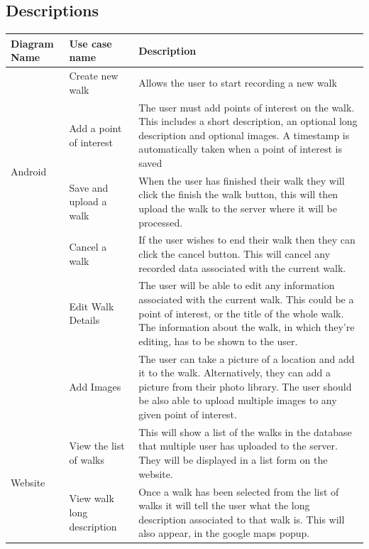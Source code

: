 \documentclass[12pt]{article}
\begin{document}
\subsection{Descriptions}
\setlength\LTleft{-1cm}
\begin{longtable}{|p{2cm}|p{3cm}|p{10cm}|}
\hline
	Diagram Name & Use case name  & Description \\
\hline

 \multirow{4}{*}{Android} & \multicolumn{1}{|p{3cm}|}{Create new walk} & \multicolumn{1}{|p{10cm}|}{Allows the user to start recording a new walk} \\\cline{2-3} & \multicolumn{1}{|p{3cm}|}{Add a point of interest
} & \multicolumn{1}{|p{10cm}|}{The user must add points of interest on the walk. This includes a short description, an optional long description and optional images. A timestamp is automatically taken when a point of interest is saved}
\\\cline{2-3} & \multicolumn{1}{|p{3cm}|}{Save and upload a walk} & \multicolumn{1}{|p{10cm}|}{When the user has finished their walk they will click the finish the walk button, this will then upload the walk to the server where it will be processed.}
\\\cline{2-3} & \multicolumn{1}{|p{3cm}|}{Cancel a walk} & \multicolumn{1}{|p{10cm}|}{If the user wishes to end their walk then they can click the cancel button. This will cancel any recorded data associated with the current walk.}
\\\cline{2-3} & \multicolumn{1}{|p{3cm}|}{Edit Walk Details} & \multicolumn{1}{|p{10cm}|}{The user will be able to edit any information associated with the current walk. This could be a point of interest, or the title of the whole walk. The information about the walk, in which they're editing, has to be shown to the user.}
\\\cline{2-3} & \multicolumn{1}{|p{3cm}|}{Add Images} & \multicolumn{1}{|p{10cm}|}{The user can take a picture of a location and add it to the walk. Alternatively, they can add a picture from their photo library. The user should be also able to upload multiple images to any given point of interest.}
\\\hline
 \multirow{4}{*}{Website} & \multicolumn{1}{|p{3cm}|}{View the list of walks} & \multicolumn{1}{|p{10cm}|}{This will show a list of the walks in the database that multiple user has uploaded to the server. They will be displayed in a list form on the website.} \\\cline{2-3} & \multicolumn{1}{|p{3cm}|}{View walk long description}& \multicolumn{1}{|p{10cm}|}{Once a walk has been selected from the list of walks it will tell the user what the long description associated to that walk is. This will also appear, in the google maps popup.}

\end{longtable}
\end{document}
